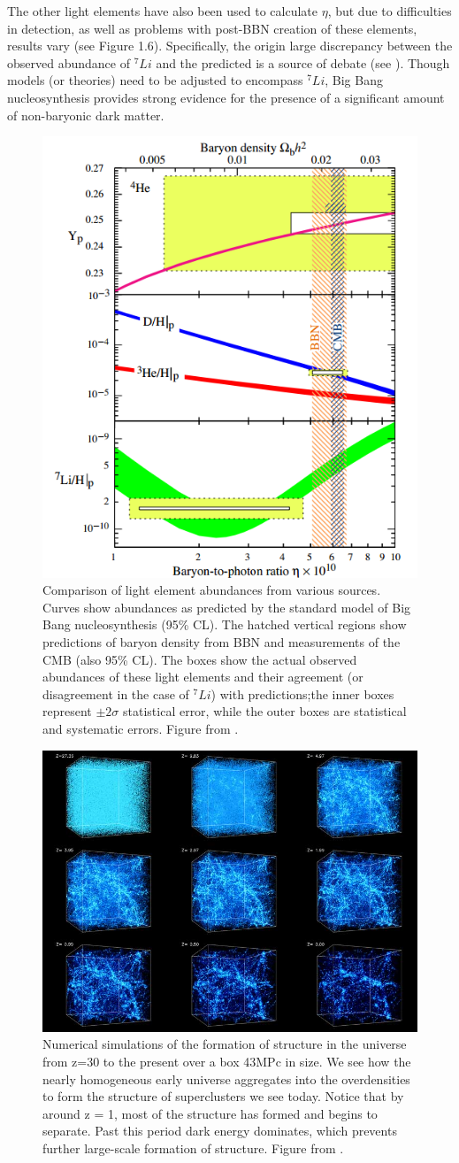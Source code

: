 \documentclass{report}
\begin{document}
The other light elements have also been used to calculate $\eta$, but due to difficulties in detection, as well as problems with post-BBN creation of these elements, results vary (see Figure 1.6). Specifically, the origin large discrepancy between the observed abundance of $^7Li$ and the predicted is a source of debate (see \cite{Amsler2008}). Though models (or theories) need to be adjusted to encompass $^7Li$, Big Bang nucleosynthesis provides strong evidence for the presence of a significant amount of non-baryonic dark matter.

\begin{figure}
\centering
\includegraphics[width = .4\textwidth]{Deuterium.png}
\caption{Comparison of light element abundances from various sources. Curves show abundances as predicted by the standard model of Big Bang nucleosynthesis \cite{Cyburt2008} (95\% CL). The hatched vertical regions show predictions of baryon density from BBN and measurements of the CMB (also 95\% CL). The boxes show the actual observed abundances of these light elements and their agreement (or disagreement in the case of $^7Li$) with predictions;the inner boxes represent $\pm2\sigma$ statistical error, while the outer boxes are statistical and systematic errors. Figure from \cite{Amsler2008}.}
\end{figure}

\begin{figure}
\centering
\includegraphics[width = .5\textwidth]{structure_formation.jpg}
\caption{Numerical simulations of the formation of structure in the universe from z=30 to the present over a box 43MPc in size. We see how the nearly homogeneous early universe aggregates into the overdensities to form the structure of superclusters we see today. Notice that by around z = 1, most of the structure has formed and begins to separate. Past this period dark energy dominates, which prevents further large-scale formation of structure. Figure from \cite{Simulation}.}
\end{figure}
\end{document}
